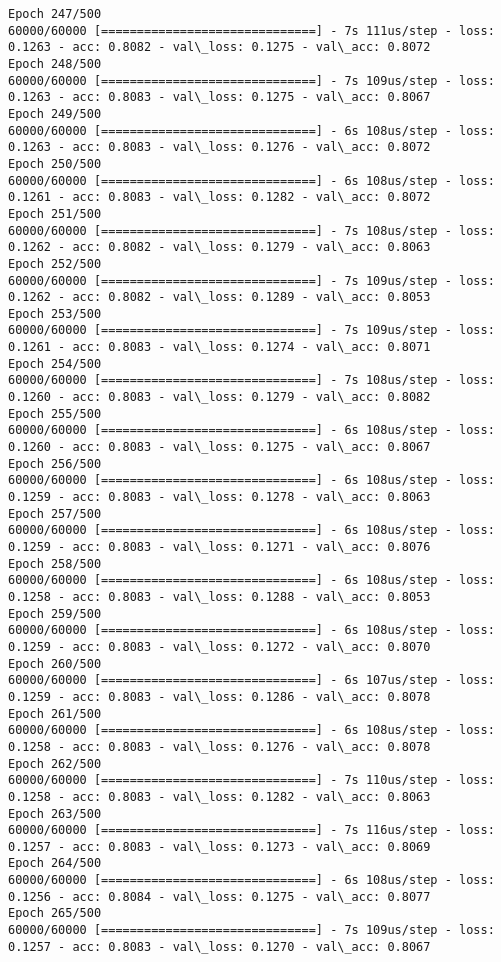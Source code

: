 \documentclass[11pt]{article}
\begin{document}
\begin{Verbatim}[commandchars=\\\{\}]
Epoch 247/500
60000/60000 [==============================] - 7s 111us/step - loss: 0.1263 - acc: 0.8082 - val\_loss: 0.1275 - val\_acc: 0.8072
Epoch 248/500
60000/60000 [==============================] - 7s 109us/step - loss: 0.1263 - acc: 0.8083 - val\_loss: 0.1275 - val\_acc: 0.8067
Epoch 249/500
60000/60000 [==============================] - 6s 108us/step - loss: 0.1263 - acc: 0.8083 - val\_loss: 0.1276 - val\_acc: 0.8072
Epoch 250/500
60000/60000 [==============================] - 6s 108us/step - loss: 0.1261 - acc: 0.8083 - val\_loss: 0.1282 - val\_acc: 0.8072
Epoch 251/500
60000/60000 [==============================] - 7s 108us/step - loss: 0.1262 - acc: 0.8082 - val\_loss: 0.1279 - val\_acc: 0.8063
Epoch 252/500
60000/60000 [==============================] - 7s 109us/step - loss: 0.1262 - acc: 0.8082 - val\_loss: 0.1289 - val\_acc: 0.8053
Epoch 253/500
60000/60000 [==============================] - 7s 109us/step - loss: 0.1261 - acc: 0.8083 - val\_loss: 0.1274 - val\_acc: 0.8071
Epoch 254/500
60000/60000 [==============================] - 7s 108us/step - loss: 0.1260 - acc: 0.8083 - val\_loss: 0.1279 - val\_acc: 0.8082
Epoch 255/500
60000/60000 [==============================] - 6s 108us/step - loss: 0.1260 - acc: 0.8083 - val\_loss: 0.1275 - val\_acc: 0.8067
Epoch 256/500
60000/60000 [==============================] - 6s 108us/step - loss: 0.1259 - acc: 0.8083 - val\_loss: 0.1278 - val\_acc: 0.8063
Epoch 257/500
60000/60000 [==============================] - 6s 108us/step - loss: 0.1259 - acc: 0.8083 - val\_loss: 0.1271 - val\_acc: 0.8076
Epoch 258/500
60000/60000 [==============================] - 6s 108us/step - loss: 0.1258 - acc: 0.8083 - val\_loss: 0.1288 - val\_acc: 0.8053
Epoch 259/500
60000/60000 [==============================] - 6s 108us/step - loss: 0.1259 - acc: 0.8083 - val\_loss: 0.1272 - val\_acc: 0.8070
Epoch 260/500
60000/60000 [==============================] - 6s 107us/step - loss: 0.1259 - acc: 0.8083 - val\_loss: 0.1286 - val\_acc: 0.8078
Epoch 261/500
60000/60000 [==============================] - 6s 108us/step - loss: 0.1258 - acc: 0.8083 - val\_loss: 0.1276 - val\_acc: 0.8078
Epoch 262/500
60000/60000 [==============================] - 7s 110us/step - loss: 0.1258 - acc: 0.8083 - val\_loss: 0.1282 - val\_acc: 0.8063
Epoch 263/500
60000/60000 [==============================] - 7s 116us/step - loss: 0.1257 - acc: 0.8083 - val\_loss: 0.1273 - val\_acc: 0.8069
Epoch 264/500
60000/60000 [==============================] - 6s 108us/step - loss: 0.1256 - acc: 0.8084 - val\_loss: 0.1275 - val\_acc: 0.8077
Epoch 265/500
60000/60000 [==============================] - 7s 109us/step - loss: 0.1257 - acc: 0.8083 - val\_loss: 0.1270 - val\_acc: 0.8067

\end{Verbatim}
\end{document}
